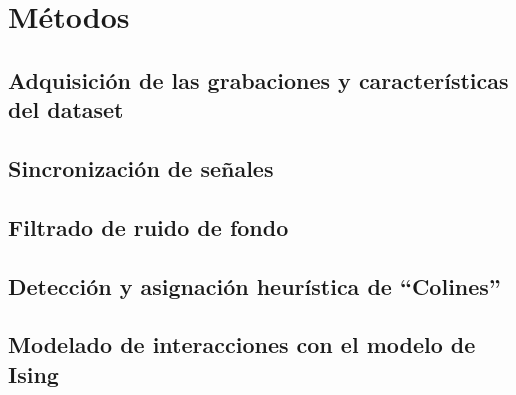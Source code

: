 \chapter{Métodos}\label{chapter:Methods}

\section{Adquisición de las grabaciones y características del dataset}
\label{sec:dataset}


\section{Sincronización de señales}
\label{sec:sincronizacion}


\section{Filtrado de ruido de fondo}
\label{sec:filtrado}


\section{Detección y asignación heurística de “Colines”}
\label{sec:deteccion_asignacion}


\section{Modelado de interacciones con el modelo de Ising}
\label{sec:modelado_ising}

